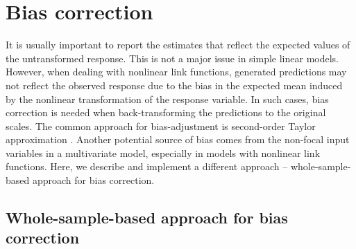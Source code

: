 
\section{Bias correction}

It is usually important to report the estimates that reflect the expected values of the untransformed response. This is not a major issue in simple linear models. However, when dealing with nonlinear link functions,  generated predictions may not reflect the observed response due to the bias in the expected mean induced by the nonlinear transformation of the response variable. In such cases, bias correction is needed when back-transforming the predictions to the original scales. The common approach for bias-adjustment is second-order Taylor approximation \citep{lenth2018package, duursma2003bias}. Another potential source of bias comes from the non-focal input variables in a multivariate model, especially in models with nonlinear link functions. Here, we describe and implement a different approach -- whole-sample-based approach for bias correction.

\subsection{Whole-sample-based approach for bias correction}

